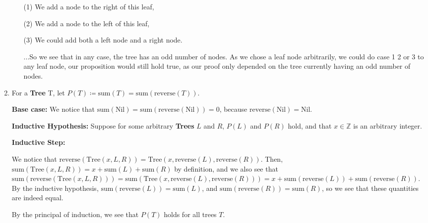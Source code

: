 \documentclass[12pt]{article}
\def\mbb#1{\mathbb{#1}}
\def\bZ{\mbb{Z}}
\theoremstyle{definition}
\theoremstyle{remark}
\begin{document}
\begin{enumerate}[leftmargin=\labelsep]
\begin{enumerate}
			(1) We add a node to the right of this leaf,
			
			(2) We add a node to the left of this leaf,
			
			(3) We could add both a left node and a right node.
			
			...So we see that in any case, the tree has an odd number of nodes. As we chose a leaf node arbitrarily, we could do case 1 2 or 3 to any leaf node, our proposition would still hold true, as our proof only depended on the tree currently having an odd number of nodes. 
		\end{enumerate}
		\item For a \textbf{Tree} T, let $P(T) \coloneqq \mathrm{sum}(T) = \mathrm{sum}(\mathrm{reverse}(T))$.
		
		\textbf{Base case: } We notice that $\mathrm{sum}(\mathrm{Nil}) = \mathrm{sum}(\mathrm{reverse}(\mathrm{Nil})) = 0$, because $\mathrm{reverse}(\mathrm{Nil}) = \mathrm{Nil}$.
		
		\textbf{Inductive Hypothesis: } Suppose for some arbitrary \textbf{Trees} $L$ and $R$, $P(L)$ and $P(R)$ hold, and that $x \in \bZ$ is an arbitrary integer.
		
		\textbf{Inductive Step: } 
		
		 We notice that $\mathrm{reverse}(\mathrm{Tree}(x, L, R)) = \mathrm{Tree}(x, \mathrm{reverse}(L), \mathrm{reverse}(R))$.  Then, $\mathrm{sum}(\mathrm{Tree}(x, L, R)) = x + \mathrm{sum}(L) + \mathrm{sum}(R)$ by definition, and we also see that
		 $\mathrm{sum}(\mathrm{reverse}(\mathrm{Tree}(x, L, R))) = \mathrm{sum}(\mathrm{Tree}(x, \mathrm{reverse}(L), \mathrm{reverse}(R))) = x + \mathrm{sum}(\mathrm{reverse}(L)) + \mathrm{sum}(\mathrm{reverse}(R))$. By the inductive hypothesis, $\mathrm{sum}(\mathrm{reverse}(L)) = \mathrm{sum}(L)$, and $\mathrm{sum}(\mathrm{reverse}(R)) = \mathrm{sum}(R)$, so we see that these quantities are indeed equal.
		 
		 By the principal of induction, we see that $P(T)$ holds for all trees $T$.
	\end{enumerate}
\end{document}
